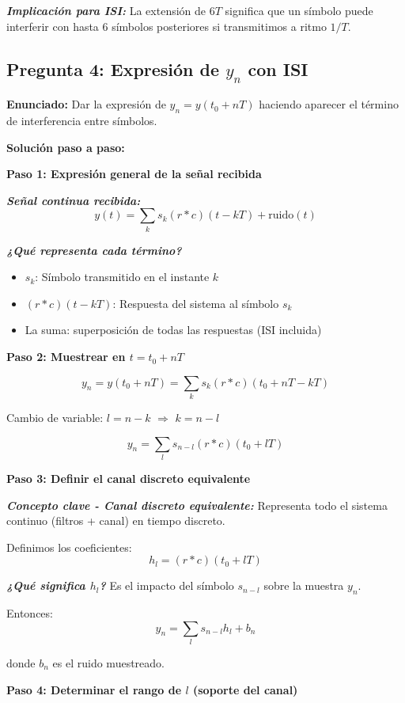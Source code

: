\documentclass[11pt,a4paper]{article}
\begin{document}
\textit{\textbf{Implicaci\'on para ISI:}} La extensi\'on de $6T$ significa que un s\'imbolo puede interferir con hasta 6 s\'imbolos posteriores si transmitimos a ritmo $1/T$.

\subsection*{Pregunta 4: Expresi\'on de $y_n$ con ISI}

\textbf{Enunciado:} Dar la expresi\'on de $y_n = y(t_0 + nT)$ haciendo aparecer el t\'ermino de interferencia entre s\'imbolos.

\vspace{0.3cm}
\textbf{Soluci\'on paso a paso:}

\textbf{Paso 1: Expresi\'on general de la se\~nal recibida}

\textit{\textbf{Se\~nal continua recibida:}}
\[
y(t) = \sum_k s_k (r * c)(t - kT) + \text{ruido}(t)
\]

\textit{\textbf{¿Qu\'e representa cada t\'ermino?}}
\begin{itemize}
    \item $s_k$: S\'imbolo transmitido en el instante $k$
    \item $(r*c)(t-kT)$: Respuesta del sistema al s\'imbolo $s_k$
    \item La suma: superposici\'on de todas las respuestas (ISI incluida)
\end{itemize}

\textbf{Paso 2: Muestrear en $t = t_0 + nT$}

\[
y_n = y(t_0 + nT) = \sum_k s_k (r * c)(t_0 + nT - kT)
\]

Cambio de variable: $l = n-k$ $\Rightarrow$ $k = n-l$

\[
y_n = \sum_l s_{n-l} (r * c)(t_0 + lT)
\]

\textbf{Paso 3: Definir el canal discreto equivalente}

\textit{\textbf{Concepto clave - Canal discreto equivalente:}} Representa todo el sistema continuo (filtros + canal) en tiempo discreto.

Definimos los coeficientes:
\[
h_l = (r * c)(t_0 + lT)
\]

\textit{\textbf{¿Qu\'e significa $h_l$?}} Es el impacto del s\'imbolo $s_{n-l}$ sobre la muestra $y_n$.

Entonces:
\[
y_n = \sum_l s_{n-l} h_l + b_n
\]

donde $b_n$ es el ruido muestreado.

\textbf{Paso 4: Determinar el rango de $l$ (soporte del canal)}
\end{document}
